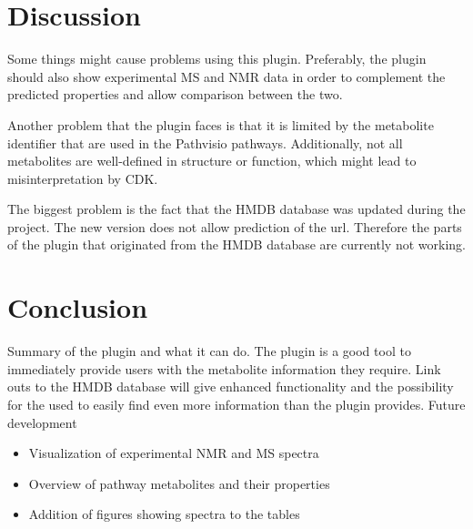 \documentclass{bioinfo}
\begin{document}

\section{Discussion}
Some things might cause problems using this plugin. Preferably, the plugin should also show experimental MS and NMR data in order to complement the predicted properties and allow comparison between the two.

Another problem that the plugin faces is that it is limited by the metabolite identifier that are used in the Pathvisio pathways. Additionally, not all metabolites are well-defined in structure or function, which might lead to misinterpretation by CDK. 

The biggest problem is the fact that the HMDB database was updated during the project. The new version does not allow prediction of the url. Therefore the parts of the plugin that originated from the HMDB database are currently not working.

\section{Conclusion}

Summary of the plugin and what it can do.
The plugin is a good tool to immediately provide users with the metabolite information they require. Link outs to the HMDB database will give enhanced functionality and the possibility for the used to easily find even more information than the plugin provides.
Future development
\begin{itemize}
    \item Visualization of experimental NMR and MS spectra
    \item Overview of pathway metabolites and their properties
    \item Addition of figures showing spectra to the tables
\end{itemize}


%
%
%
%
%
%
%

\end{document}
